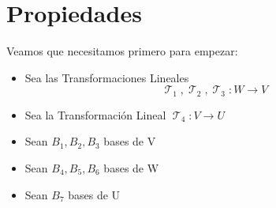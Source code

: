 \documentclass[12pt]{report}                                    %
\DeclareMathOperator \LinealTransformation {\mathcal{T}}        %
\begin{document}
        \clearpage
        \section{Propiedades}

            Veamos que necesitamos primero para empezar:
            
            \begin{itemize}
                \item Sea las Transformaciones Lineales 
                    \begin{equation*}
                        \LinealTransformation_1,
                        \LinealTransformation_2,
                        \LinealTransformation_3 : W \to V
                    \end{equation*}

                \item Sea la Transformación Lineal $\LinealTransformation_4: V \to U$
                
                \item Sean $B_1, B_2, B_3$ bases de V
                
                \item Sean $B_4, B_5, B_6$ bases de W
                
                \item Sean $B_7$ bases de U
            \end{itemize}
\end{document}
